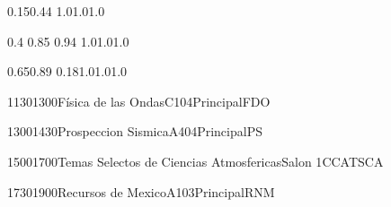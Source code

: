 \documentclass[a4paper,10pt]{report}
\begin{document}
 \thispagestyle{empty}
 \begin{landscape}
 
 \setslotsize{2.8cm}{0.25cm}
 \settextframe{1.0mm}
 
 
  {0.15}{0.44} {1.0}{1.0}{1.0}
 
      {0.4} {0.85} {0.94} {1.0}{1.0}{1.0}
 
        {0.65}{0.89} {0.18}{1.0}{1.0}{1.0}

 
 
 
 
 
 
 \begin{timetable}
 

 
   
    {1130}{1300}{Física de las Ondas}{C104}{{\tiny Principal}}{FDO}
   
    {1300}{1430}{Prospeccion Sismica}{A404}{{\tiny  Principal}}{PS}
   
    {1500}{1700}{Temas Selectos de Ciencias Atmosfericas}{Salon 1}{{\tiny CCA}}{TSCA}
   
    {1730}{1900}{Recursos de Mexico}{A103}{{\tiny Principal}}{RNM}
   

\end{timetable}
\end{landscape}
\end{document}
